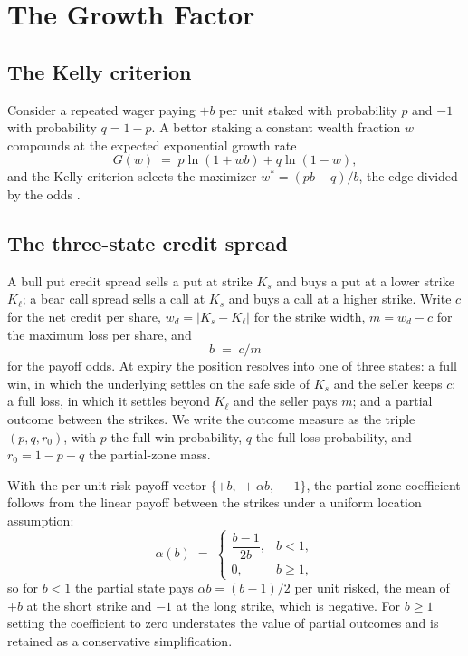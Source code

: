 \documentclass[11pt]{article}
\begin{document}
\section{The Growth Factor}
\label{sec:growth}

\subsection{The Kelly criterion}

Consider a repeated wager paying $+b$ per unit staked with probability $p$ and
$-1$ with probability $q = 1-p$. A bettor staking a constant wealth fraction
$w$ compounds at the expected exponential growth rate
\begin{equation}
G(w) \;=\; p \ln(1 + wb) + q \ln(1 - w),
\label{eq:kelly2}
\end{equation}
and the Kelly criterion selects the maximizer
$w^\ast = (pb - q)/b$, the edge divided by the odds \cite{kelly1956}.

\subsection{The three-state credit spread}
\label{sec:instrument}

A bull put credit spread sells a put at strike $K_s$ and buys a put at a lower
strike $K_\ell$; a bear call spread sells a call at $K_s$ and buys a call at a
higher strike. Write $c$ for the net credit per share, $w_d = |K_s - K_\ell|$
for the strike width, $m = w_d - c$ for the maximum loss per share, and
\begin{equation}
b \;=\; c / m
\label{eq:odds}
\end{equation}
for the payoff odds. At expiry the position resolves into one of three states:
a full win, in which the underlying settles on the safe side of $K_s$ and the
seller keeps $c$; a full loss, in which it settles beyond $K_\ell$ and the
seller pays $m$; and a partial outcome between the strikes. We write the
outcome measure as the triple $(p, q, r_0)$, with $p$ the full-win
probability, $q$ the full-loss probability, and $r_0 = 1 - p - q$ the
partial-zone mass.

With the per-unit-risk payoff vector $\{+b,\ +\alpha b,\ -1\}$, the
partial-zone coefficient follows from the linear payoff between the strikes
under a uniform location assumption:
\begin{equation}
\alpha(b) \;=\;
\begin{cases}
\dfrac{b-1}{2b}, & b < 1,\\[6pt]
0, & b \geq 1,
\end{cases}
\label{eq:alpha}
\end{equation}
so for $b < 1$ the partial state pays $\alpha b = (b-1)/2$ per unit risked,
the mean of $+b$ at the short strike and $-1$ at the long strike, which is
negative. For $b \geq 1$ setting the coefficient to zero understates the value
of partial outcomes and is retained as a conservative simplification.
\end{document}
